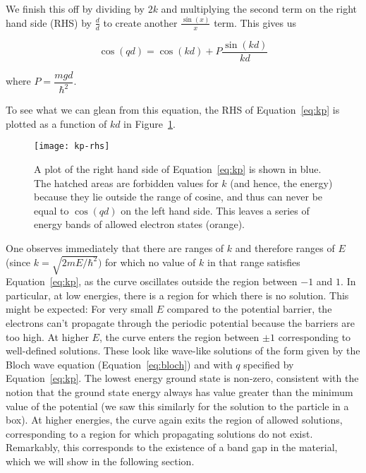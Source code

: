 We finish this off by dividing by $2k$ and multiplying the second term on the right hand side (RHS) by $\frac{d}{d}$ to create another $\frac{\sin(x)}{x}$ term. This gives us
\begin{tcolorbox}[title = Kronig-Penney model allowed solutions] \vspace{-2ex}
	\begin{equation}
		\cos(qd) = \cos(kd) + P\frac{\sin(kd)}{kd} \label{eq:kp}
	\end{equation}
\end{tcolorbox}
where $P = \dfrac{mgd}{\hbar^2}$. \par 

To see what we can glean from this equation, the RHS of Equation~\ref{eq:kp} is plotted as a function of $kd$ in Figure~\ref{fig:kp}.

\begin{figure}[!h]
	\centering 
	\texttt{[image: kp-rhs]}
	\caption{A plot of the right hand side of Equation~\ref{eq:kp} is shown in blue. The hatched areas are forbidden values for $k$ (and hence, the energy) because they lie outside the range of cosine, and thus can never be equal to $\cos(qd)$ on the left hand side. This leaves a series of energy bands of allowed electron states (orange).}
	\label{fig:kp}
\end{figure}

One observes immediately that there are ranges of $k$ and therefore ranges of $E$ (since $k=\sqrt{2mE/\hbar^2})$ for which no value of $k$ in that range satisfies Equation~\ref{eq:kp}, as the curve oscillates outside the region between $-1$ and $1$. In particular, at low energies, there is a region for which there is no solution. This might be expected: For very small $E$ compared to the potential barrier, the electrons can't propagate through the periodic potential because the barriers are too high. At higher $E$, the curve enters the region between $\pm 1$ corresponding to well-defined solutions. These look like wave-like solutions of the form given by the Bloch wave equation (Equation~\ref{eq:bloch}) and with $q$ specified by Equation~\ref{eq:kp}. The lowest energy ground state is non-zero, consistent with the notion that the ground state energy always has value greater than the minimum value of the potential (we saw this similarly for the solution to the particle in a box). At higher energies, the curve again exits the region of allowed solutions, corresponding to a region for which propagating solutions do not exist. Remarkably, this corresponds to the existence of a band gap in the material, which we will show in the following section.

